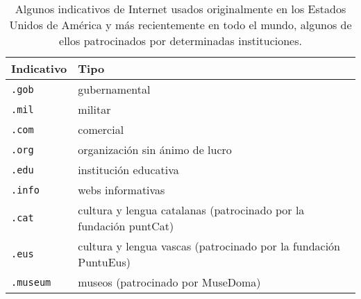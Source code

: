 \begin{table} \begin{center} \begin{tabular}{l|l} \hline\hline {\sc Indicativo} &{\sc Tipo} \\\hline {\tt .gob} &gubernamental \\ {\tt .mil} &militar \\ {\tt .com} &comercial \\ {\tt .org} &organización sin ánimo de lucro \\ {\tt .edu} &institución educativa \\ {\tt .info} &webs informativas \\ {\tt .cat} &cultura y lengua catalanas (patrocinado por la fundación puntCat) \\ {\tt .eus} &cultura y lengua vascas (patrocinado por la fundación PuntuEus) \\ {\tt .museum} &museos (patrocinado por MuseDoma) \\ \hline\end{tabular} \end{center} \caption{Algunos indicativos de Internet usados originalmente en los Estados Unidos de América y más recientemente en todo el mundo, algunos de ellos patrocinados por determinadas instituciones.} \label{tb:tipus} \end{table} 

